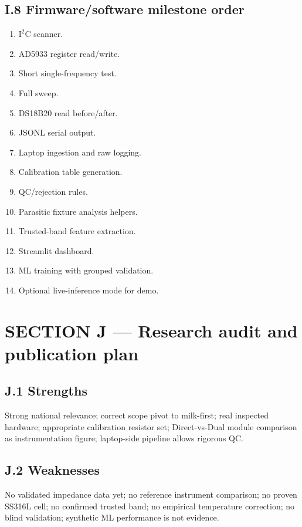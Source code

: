\documentclass[11pt,a4paper]{article}
\begin{document}
\subsection{I.8 Firmware/software milestone order}

\begin{enumerate}
\item $\mathrm{I^2C}$ scanner.
\item AD5933 register read/write.
\item Short single-frequency test.
\item Full sweep.
\item DS18B20 read before/after.
\item JSONL serial output.
\item Laptop ingestion and raw logging.
\item Calibration table generation.
\item QC/rejection rules.
\item Parasitic fixture analysis helpers.
\item Trusted-band feature extraction.
\item Streamlit dashboard.
\item ML training with grouped validation.
\item Optional live-inference mode for demo.
\end{enumerate}

\section{SECTION J --- Research audit and publication plan}
\label{sec:J}

\subsection{J.1 Strengths} Strong national relevance; correct scope pivot to milk-first; real inspected hardware; appropriate calibration resistor set; Direct-vs-Dual module comparison as instrumentation figure; laptop-side pipeline allows rigorous QC.

\subsection{J.2 Weaknesses} No validated impedance data yet; no reference instrument comparison; no proven SS316L cell; no confirmed trusted band; no empirical temperature correction; no blind validation; synthetic ML performance is not evidence.
\end{document}
